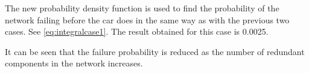 The new probability density function is used to find the probability of the network failing before the car does in the same way as with the previous two cases. See \autoref{eq:integralcase1}. The result obtained for this case is 0.0025. 

It can be seen that the failure probability is reduced as the number of redundant components in the network increases.